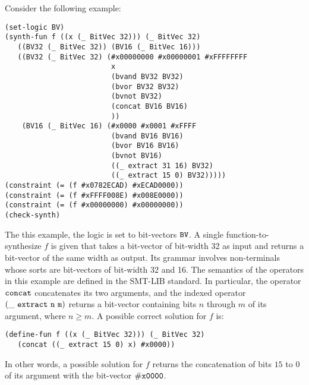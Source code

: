 \documentclass[english,a4paper,10pt]{article}
\begin{document}
\begin{example}
Consider the following example:
\begin{lstlisting}[basicstyle={\ttfamily}]
(set-logic BV)
(synth-fun f ((x (_ BitVec 32))) (_ BitVec 32)
   ((BV32 (_ BitVec 32)) (BV16 (_ BitVec 16)))
   ((BV32 (_ BitVec 32) (#x00000000 #x00000001 #xFFFFFFFF
                         x
                         (bvand BV32 BV32)
                         (bvor BV32 BV32)
                         (bvnot BV32)
                         (concat BV16 BV16)
                         ))
    (BV16 (_ BitVec 16) (#x0000 #x0001 #xFFFF
                         (bvand BV16 BV16)
                         (bvor BV16 BV16)
                         (bvnot BV16)
                         ((_ extract 31 16) BV32)
                         ((_ extract 15 0) BV32)))))
(constraint (= (f #x0782ECAD) #xECAD0000))
(constraint (= (f #xFFFF008E) #x008E0000))
(constraint (= (f #x00000000) #x00000000))
(check-synth)
\end{lstlisting}
The this example, the logic is set to bit-vectors ${\tt BV}$.
A single function-to-synthesize $f$ is given that takes a
bit-vector of bit-width 32 as input and returns a bit-vector of the same width as output.
Its grammar involves non-terminals whose sorts are bit-vectors of
bit-width 32 and 16.
The semantics of the operators in this example are defined in the SMT-LIB standard.
In particular,
the operator ${\tt concat}$ concatenates its two arguments,
and the indexed operator ${\tt (\_\ extract\ n\ m)}$
returns a bit-vector containing bits $n$ through $m$ of its
argument, where $n \geq m$.
A possible correct solution for $f$ is:
\begin{lstlisting}[basicstyle={\ttfamily}]
(define-fun f ((x (_ BitVec 32))) (_ BitVec 32) 
   (concat ((_ extract 15 0) x) #x0000))
\end{lstlisting}
In other words, a possible solution for $f$ 
returns the concatenation of bits $15$ to $0$ of its argument
with the bit-vector ${\tt \#x0000}$.
\end{example}
\end{document}

